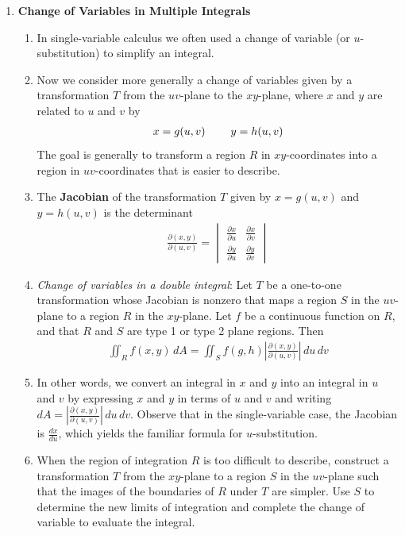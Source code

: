 \documentclass[10pt]{article}
\begin{document}
\begin{multicols*}{2}
\begin{enumerate}
    \item \textbf{Change of Variables in Multiple Integrals}
    \begin{enumerate}
        \item In single-variable calculus we often used a change of variable (or $u$-substitution) to simplify an integral. 
        \item Now we consider more generally a change of variables given by a transformation $T$ from the $uv$-plane to the $xy$-plane, where $x$ and $y$ are related to $u$ and $v$ by
        \begin{align*}
            x = g(u,v) \hspace{8mm} y = h(u,v)
        \end{align*}
        The goal is generally to transform a region $R$ in $xy$-coordinates into a region in $uv$-coordinates that is easier to describe.
        \item The \textbf{Jacobian} of the transformation $T$ given by $x=g(u,v)$ and $y=h(u,v)$ is the determinant
        \begin{align*}
            \frac{\partial (x,y)}{\partial (u,v)}  =
            \begin{vmatrix}
                \frac{\partial x}{\partial u} & \frac{\partial x}{\partial v} \\[8pt]
                \frac{\partial y}{\partial u} & \frac{\partial y}{\partial v}
            \end{vmatrix}
        \end{align*}
        \item \textit{Change of variables in a double integral}: Let $T$ be a one-to-one transformation whose Jacobian is nonzero that maps a region $S$ in the $uv$-plane to a region $R$ in the $xy$-plane. Let $f$ be a continuous function on $R$, and that $R$ and $S$ are type 1 or type 2 plane regions. Then
        \begin{align*}
            \iint_R f(x,y) \,dA = \iint_S f(g, h) \left| \frac{\partial (x,y)}{\partial (u,v)} \right| \,du \,dv
        \end{align*}
        \item In other words, we convert an integral in $x$ and $y$ into an integral in $u$ and $v$ by expressing $x$ and $y$ in terms of $u$ and $v$ and writing $dA = \left| \frac{\partial (x,y)}{\partial (u,v)} \right| \,du \,dv$. Observe that in the single-variable case, the Jacobian is $\frac{dx}{du}$, which yields the familiar formula for $u$-substitution. 
        \item When the region of integration $R$ is too difficult to describe, construct a transformation $T$ from the $xy$-plane to a region $S$ in the $uv$-plane such that the images of the boundaries of $R$ under $T$ are simpler. Use $S$ to determine the new limits of integration and complete the change of variable to evaluate the integral.

\end{enumerate}
\end{enumerate}
\end{multicols*}
\end{document}
